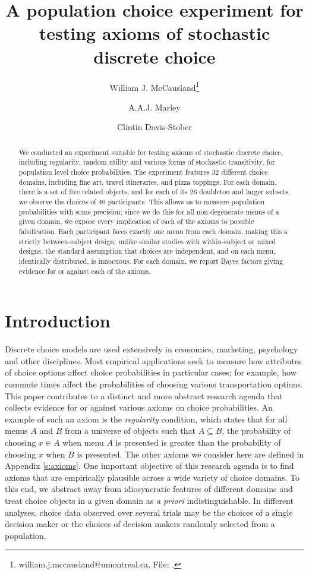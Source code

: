 \documentclass[11pt,letter]{article}
\title{A population choice experiment for testing axioms of stochastic discrete choice}{}
\author[1]{William J. McCausland\thanks{william.j.mccausland@umontreal.ca, File: \texttt{\currfilename}.}}
\author[2]{A.A.J. Marley}
\author[3]{Clintin Davis-Stober}
\affil[1]{Universit\'e de Montr\'eal}
\affil[2]{University of Victoria}
\affil[3]{University of Missouri}
\newcommand{\menu}{menu}
\newcommand{\menus}{menus}
\begin{document}
\maketitle

\begin{abstract}
	We conducted an experiment suitable for testing axioms of stochastic discrete choice, including regularity, random utility and various forms of stochastic transitivity, for population level choice probabilities.
	The experiment features 32 different choice domains, including fine art, travel itineraries, and pizza toppings.
	For each domain, there is a set of five related objects, and for each of its 26 doubleton and larger subsets, we observe the choices of 40 participants.
	This allows us to measure population probabilities with some precision; since we do this for all non-degenerate \menus{} of a given domain, we expose every implication of each of the axioms to possible falsification.
	Each participant faces exactly one \menu{} from each domain, making this a strictly between-subject design; unlike similar studies with within-subject or mixed designs, the standard assumption that choices are independent, and on each \menu{}, identically distributed, is innocuous.
	For each domain, we report Bayes factors giving evidence for or against each of the axioms.
\end{abstract}

\section{Introduction}

Discrete choice models are used extensively in economics, marketing, psychology and other disciplines.
Most empirical applications seek to measure how attributes of choice options affect choice probabilities in particular cases; for example, how commute times affect the probabilities of choosing various transportation options.
This paper contributes to a distinct and more abstract research agenda that collects evidence for or against various axioms on choice probabilities.
An example of such an axiom is the {\em regularity} condition, which states that for all \menus{} $A$ and $B$ from a universe of objects such that $A \subseteq B$, the probability of choosing $x \in A$ when \menu{} $A$ is presented is greater than the probability of choosing $x$ when $B$ is presented.
The other axioms we consider here are defined in Appendix \ref{s:axioms}.
One important objective of this research agenda is to find axioms that are empirically plausible across a wide variety of choice domains.
To this end, we abstract away from idiosyncratic features of different domains and treat choice objects in a given domain as {\em a priori} indistinguishable.
In different analyses, choice data observed over several trials may be the choices of a single decision maker or the choices of decision makers randomly selected from a population.
\end{document}
